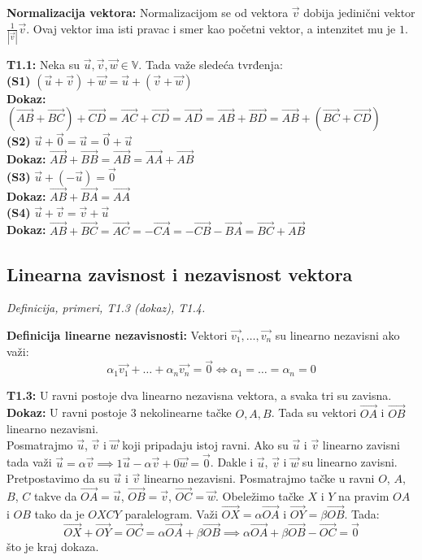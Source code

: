 \documentclass[12pt]{article}
\newcommand{\vek}[1]{\overrightarrow{#1}}
\begin{document}
\textbf{Normalizacija vektora:} Normalizacijom se od vektora $\vek{v}$ dobija
jedinični vektor $\frac{1}{|\vek{v}|}\vek{v}$. Ovaj vektor ima isti pravac
i smer kao početni vektor, a intenzitet mu je $1$.
\par

\textbf{T1.1:} Neka su $\vek{u}, \vek{v}, \vek{w}\in\mathbb{V}$. Tada važe
sledeća tvrđenja:\\
\textbf{(S1)}
$(\vek{u}+\vek{v})+\vek{w}=\vek{u}+(\vek{v}+\vek{w})$\\
\textbf{Dokaz:}
$(\vek{AB}+\vek{BC})+\vek{CD}=\vek{AC}+\vek{CD}=\vek{AD}=\vek{AB}+\vek{BD}
    =\vek{AB}+(\vek{BC}+\vek{CD})$\\
\textbf{(S2)}
$\vek{u}+\vek{0}=\vek{u}=\vek{0}+\vek{u}$\\
\textbf{Dokaz:}
$\vek{AB}+\vek{BB}=\vek{AB}=\vek{AA}+\vek{AB}$\\
\textbf{(S3)}
$\vek{u}+(-\vek{u})=\vek{0}$\\
\textbf{Dokaz:}
$\vek{AB}+\vek{BA}=\vek{AA}$\\
\textbf{(S4)}
$\vek{u}+\vek{v}=\vek{v}+\vek{u}$\\
\textbf{Dokaz:}
$\vek{AB}+\vek{BC}=\vek{AC}=-\vek{CA}=-\vek{CB}-\vek{BA}=\vek{BC}+\vek{AB}$


\subsection{Linearna zavisnost i nezavisnost vektora}
\textit{Definicija, primeri, T1.3 (dokaz), T1.4.}
\par
\vspace*{1cm}

\textbf{Definicija linearne nezavisnosti:} Vektori $\vek{v_1},\dotsc,\vek{v_n}$
su linearno nezavisni ako važi:
$$\alpha_1\vek{v_1}+\dotsc+\alpha_n\vek{v_n}=\vek{0} \iff \alpha_1=
    \dotsc=\alpha_n=0$$
\par

\textbf{T1.3:}\label{theorem:1.3} U ravni postoje dva linearno nezavisna
vektora, a svaka tri su zavisna.\\
\textbf{Dokaz:} U ravni postoje 3 nekolinearne tačke $O, A, B$. Tada su vektori
$\vek{OA}$ i $\vek{OB}$ linearno nezavisni.\\
Posmatrajmo $\vek{u}$, $\vek{v}$ i $\vek{w}$ koji pripadaju istoj ravni. Ako su
$\vek{u}$ i $\vek{v}$ linearno zavisni tada važi $\vek{u}=\alpha\vek{v}
    \implies 1\vek{u}-\alpha\vek{v}+0\vek{w}=\vek{0}$. Dakle i
$\vek{u}$, $\vek{v}$ i $\vek{w}$ su linearno zavisni.\\
Pretpostavimo da su $\vek{u}$ i $\vek{v}$ linearno nezavisni. Posmatrajmo tačke
u ravni $O$, $A$, $B$, $C$ takve da $\vek{OA}=\vek{u}$, $\vek{OB}=\vek{v}$,
$\vek{OC}=\vek{w}$. Obeležimo tačke $X$ i $Y$ na pravim $OA$ i $OB$ tako da je
$OXCY$ paralelogram. Važi $\vek{OX}=\alpha\vek{OA}$ i $\vek{OY}=\beta
    \vek{OB}$. Tada:
$$\vek{OX}+\vek{OY}=\vek{OC}=\alpha\vek{OA}+\beta\vek{OB} \implies
    \alpha\vek{OA}+\beta\vek{OB}-\vek{OC}=\vek{0}$$
što je kraj dokaza.
\par
\end{document}
